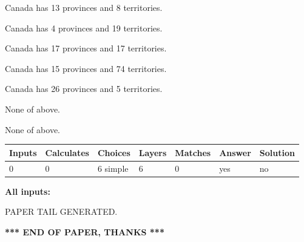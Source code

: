 \documentclass[12pt]{article}
\begin{document}
 
Canada has  13 provinces and  8 territories.
 
 
Canada has   4 provinces and  19 territories.
 
 
Canada has  17 provinces and  17 territories.
 
 
Canada has  15 provinces and  74 territories.
 
 
Canada has  26 provinces and  5 territories.
 
 
 None of above.
 
 
\noindent{}
 
 
 None of above.
 
 
\noindent{}
 
 
   
   
   
   
\noindent\begin{tabular}{|l|l|l|l|l|l|l|}
 \hline
Inputs & Calculates & Choices & Layers & Matches & Answer & Solution \\ \hline
 0  & 
 0  & 
 6
  simple  
  & 
 6  & 
 0  & 
  yes & 
  no 
  \\ \hline
 \end{tabular}
   
   
   
   
\noindent{}
   
   
   
   
\noindent\vspace{0.1in}\hspace{-0.08in} {\textbf{\Large{All inputs: }}}
   
   
   
   
   
   
 \vspace{0.2in}
 
   
   
\vspace{2.0in} PAPER TAIL GENERATED.
   
   
   
   
\vspace{1.0in} 
{\textbf{\large{ *** END OF PAPER, THANKS *** }}} 
   
\end{document}
